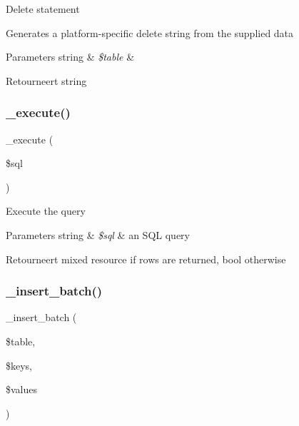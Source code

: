 Delete statement

Generates a platform-\/specific delete string from the supplied data


\begin{DoxyParams}[1]{Parameters}
string & {\em \$table} & \\
\hline
\end{DoxyParams}
\begin{DoxyReturn}{Retourneert}
string 
\end{DoxyReturn}
\mbox{\label{class_c_i___d_b__mssql__driver_a114ab675d89bf8324a41785fb475e86d}} 
\subsubsection{\texorpdfstring{\_execute()}{\_execute()}}
{\footnotesize\ttfamily \+\_\+execute (\begin{DoxyParamCaption}\item[{}]{\$sql }\end{DoxyParamCaption})\hspace{0.3cm}{\ttfamily [protected]}}

Execute the query


\begin{DoxyParams}[1]{Parameters}
string & {\em \$sql} & an S\+QL query \\
\hline
\end{DoxyParams}
\begin{DoxyReturn}{Retourneert}
mixed resource if rows are returned, bool otherwise 
\end{DoxyReturn}
\mbox{\label{class_c_i___d_b__mssql__driver_a1978e1358c812587a46e242630365099}} 
\subsubsection{\texorpdfstring{\_insert\_batch()}{\_insert\_batch()}}
{\footnotesize\ttfamily \+\_\+insert\+\_\+batch (\begin{DoxyParamCaption}\item[{}]{\$table,  }\item[{}]{\$keys,  }\item[{}]{\$values }\end{DoxyParamCaption})\hspace{0.3cm}{\ttfamily [protected]}}

